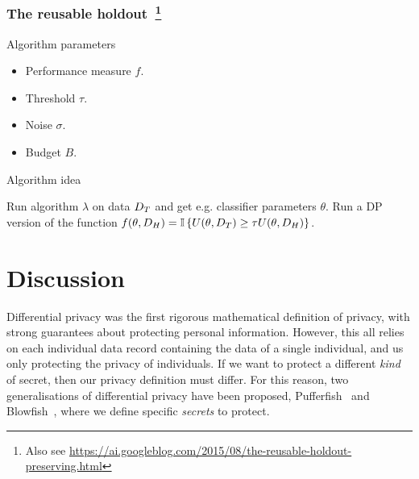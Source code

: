 \begin{frame}
  \frametitle{The reusable holdout~\cite{dwork2015reusable}\footnote{Also see \url{https://ai.googleblog.com/2015/08/the-reusable-holdout-preserving.html}}}

  \begin{block}{Algorithm parameters}
    \begin{itemize}
    \item Performance measure $f$.
    \item Threshold $\tau$. 
    \item Noise $\sigma$. 
    \item Budget $B$. 

    \end{itemize}
  \end{block}
  \begin{block}{Algorithm idea}
    \begin{algorithmic}
      \State Run algorithm $\lambda$ on data $D_T$ and get e.g. classifier parameters $\theta$.
      \State Run a DP version of the function $f(\theta, D_H) = \mathop{\mbox{\ensuremath{\mathbb{I}}}}\left\{U(\theta, D_T) \geq \tau U(\theta, D_H)\right\}$.
    \end{algorithmic}
  \end{block}
\end{frame}



\section{Discussion}
Differential privacy was the first rigorous mathematical definition of privacy, with strong guarantees about protecting personal information. However, this all relies on each individual data record containing the data of a single individual, and us only protecting the privacy of individuals. If we want to protect a different \emph{kind} of secret, then our privacy definition must differ. For this reason, two generalisations of differential privacy have been proposed, Pufferfish~\citep{pufferfish} and Blowfish~\citep{blowfish}, where we define specific \emph{secrets} to protect.


